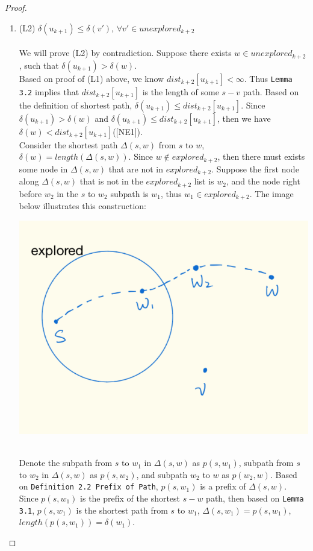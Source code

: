 \documentclass[11pt, oneside]{article}   	%
\newcommand\tab[1][1cm]{\hspace*{#1}}
\theoremstyle{definition}
\begin{document}
\begin{proof}
\begin{itemize}
\begin{enumerate}
  \item (L2) $\delta(u_{k+1}) \leq \delta(v')$, $\forall v' \in unexplored_{k+2}$
  \\\\
  We will prove (L2) by contradiction. Suppose there exists $w \in unexplored_{k+2}$, such that $\delta(u_{k+1}) > \delta(w)$. 
  \\
  Based on proof of (L1) above, we know $dist_{k+2}[u_{k+1}] < \infty$. Thus \texttt{Lemma 3.2} implies that $dist_{k+2}[u_{k+1}]$ is the length of some $s-v$ path. Based on the definition of shortest path, $\delta(u_{k+1}) \leq dist_{k+2}[u_{k+1}]$. Since $\delta(u_{k+1}) > \delta(w)$ and $\delta(u_{k+1}) \leq dist_{k+2}[u_{k+1}]$, then we have $\delta(w) < dist_{k+2}[u_{k+1}]$([NE1]). 
  \\
  Consider the shortest path $\Delta(s, w)$ from $s$ to $w$, $\delta(w) = length(\Delta(s, w))$. Since $w \notin explored_{k+2}$, then there must exists some node in $\Delta(s, w)$ that are not in $explored_{k+2}$. Suppose the first node along $\Delta(s, w)$ that is not in the $explored_{k+2}$ list is $w_2$, and the node right before $w_2$ in the $s$ to $w_2$ subpath is $w_1$, thus $w_1 \in explored_{k+2}$. The image below illustrates this construction: 
  \\
  \begin{center}
  \includegraphics[scale = 0.35]{p1.png}
  \end{center}
  \tab\\
  Denote the subpath from $s$ to $w_1$ in $\Delta(s, w)$ as $p(s, w_1)$, subpath from $s$ to $w_2$ in $\Delta(s, w)$ as $p(s, w_2)$, and subpath $w_2$ to $w$ as $p(w_2, w)$. Based on \texttt{Definition 2.2 Prefix of Path}, $p(s, w_1)$ is a prefix of $\Delta(s, w)$. Since $p(s, w_1)$ is the prefix of the shortest $s-w$ path, then based on \texttt{Lemma 3.1}, $p(s, w_1)$ is the shortest path from $s$ to $w_1$, $\Delta(s, w_1) = p(s, w_1)$, $length(p(s, w_1)) = \delta(w_1)$. 

\end{enumerate}
\end{itemize}
\end{proof}
\end{document}
